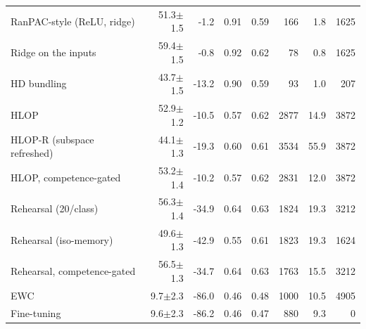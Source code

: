 \begin{tabular}{lrrrrrrr}
RanPAC-style (ReLU, ridge) & 51.3{\tiny$\pm$1.5} & -1.2 & 0.91 & 0.59 & 166 & 1.8 & 1625 \\
Ridge on the inputs & 59.4{\tiny$\pm$1.5} & -0.8 & 0.92 & 0.62 & 78 & 0.8 & 1625 \\
HD bundling & 43.7{\tiny$\pm$1.5} & -13.2 & 0.90 & 0.59 & 93 & 1.0 & 207 \\
HLOP & 52.9{\tiny$\pm$1.2} & -10.5 & 0.57 & 0.62 & 2877 & 14.9 & 3872 \\
HLOP-R (subspace refreshed) & 44.1{\tiny$\pm$1.3} & -19.3 & 0.60 & 0.61 & 3534 & 55.9 & 3872 \\
HLOP, competence-gated & 53.2{\tiny$\pm$1.4} & -10.2 & 0.57 & 0.62 & 2831 & 12.0 & 3872 \\
Rehearsal (20/class) & 56.3{\tiny$\pm$1.4} & -34.9 & 0.64 & 0.63 & 1824 & 19.3 & 3212 \\
Rehearsal (iso-memory) & 49.6{\tiny$\pm$1.3} & -42.9 & 0.55 & 0.61 & 1823 & 19.3 & 1624 \\
Rehearsal, competence-gated & 56.5{\tiny$\pm$1.3} & -34.7 & 0.64 & 0.63 & 1763 & 15.5 & 3212 \\
EWC & 9.7{\tiny$\pm$2.3} & -86.0 & 0.46 & 0.48 & 1000 & 10.5 & 4905 \\
Fine-tuning & 9.6{\tiny$\pm$2.3} & -86.2 & 0.46 & 0.47 & 880 & 9.3 & 0 \\
\bottomrule
\end{tabular}
